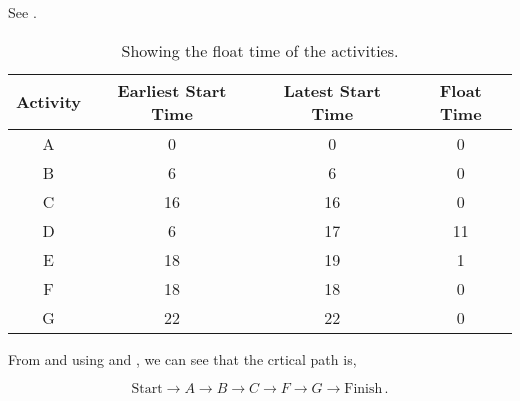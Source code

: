 \begin{subquestions}
\begin{subsubquestions}
See .

\begin{table}[ht]
	\centering
	\begin{tabular}{|c|c|c|c|}
		\hline
		Activity & Earliest Start Time & Latest Start Time & Float Time \\
		\hline
		A & 0 & 0 & 0 \\
		B & 6 & 6 & 0 \\
		C & 16 & 16 & 0 \\
		D & 6 & 17 & 11 \\
		E & 18 & 19 & 1 \\
		F & 18 & 18 & 0 \\
		G & 22 & 22 & 0 \\
		\hline
	\end{tabular}
	\caption{\label{2011:q2:tab:CritPath} Showing the float time of the activities.}
\end{table}

\subsubquestion

From  and using  and , we can see that the crtical path is,

\begin{equation}
	\text{Start} \rightarrow A \rightarrow B \rightarrow C \rightarrow F \rightarrow G \rightarrow \text{Finish}\,.
\end{equation}

\end{subsubquestions}

\end{subquestions}


